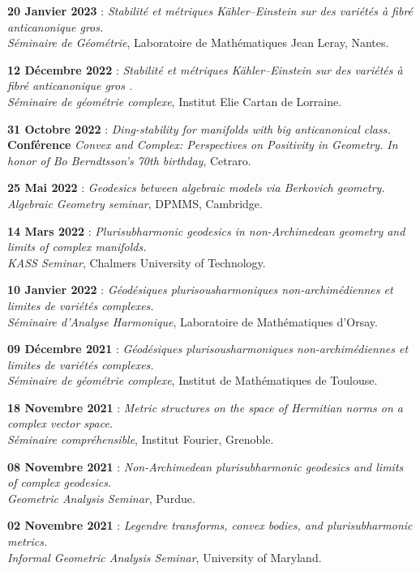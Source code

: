 \documentclass{article}
\theoremstyle{definition}
\theoremstyle{definition}
\theoremstyle{definition}
\newcommand\bsni{\bigskip\noindent}
\begin{document}
\bsni \textbf{20 Janvier 2023} : \textit{Stabilité et métriques Kähler–Einstein sur des variétés à fibré anticanonique gros.}\\
\textit{Séminaire de Géométrie}, Laboratoire de Mathématiques Jean Leray, Nantes.

\bsni \textbf{12 Décembre 2022} : \textit{Stabilité et métriques Kähler–Einstein sur des variétés à fibré anticanonique gros
.}\\
\textit{Séminaire de géométrie complexe}, Institut Elie Cartan de Lorraine.

\bsni \textbf{31 Octobre 2022} : \textit{Ding-stability for manifolds with big anticanonical class.}\\
\textbf{Conférence} \textit{Convex and Complex: Perspectives on Positivity in Geometry. In honor of Bo Berndtsson's 70th birthday}, Cetraro.

\bsni \textbf{25 Mai 2022} : \textit{Geodesics between algebraic models via Berkovich geometry.}\\
\textit{Algebraic Geometry seminar}, DPMMS, Cambridge.

\bsni \textbf{14 Mars 2022} : \textit{Plurisubharmonic geodesics in non-Archimedean geometry and limits of complex manifolds.}\\
\textit{KASS Seminar}, Chalmers University of Technology.

\bsni \textbf{10 Janvier 2022} : \textit{Géodésiques plurisousharmoniques non-archimédiennes et limites de variétés complexes.}\\
\textit{Séminaire d'Analyse Harmonique}, Laboratoire de Mathématiques d'Orsay.

\bsni \textbf{09 Décembre 2021} : \textit{Géodésiques plurisousharmoniques non-archimédiennes et limites de variétés complexes.}\\
\textit{Séminaire de géométrie complexe}, Institut de Mathématiques de Toulouse.

\bsni \textbf{18 Novembre 2021} : \textit{Metric structures on the space of Hermitian norms on a complex vector space.}\\
\textit{Séminaire compréhensible}, Institut Fourier, Grenoble.

\bsni \textbf{08 Novembre 2021} : \textit{Non-Archimedean plurisubharmonic geodesics and limits of complex geodesics.}\\
\textit{Geometric Analysis Seminar}, Purdue.

\bsni \textbf{02 Novembre 2021} : \textit{Legendre transforms, convex bodies, and plurisubharmonic metrics.}\\
\textit{Informal Geometric Analysis Seminar}, University of Maryland.
\end{document}
